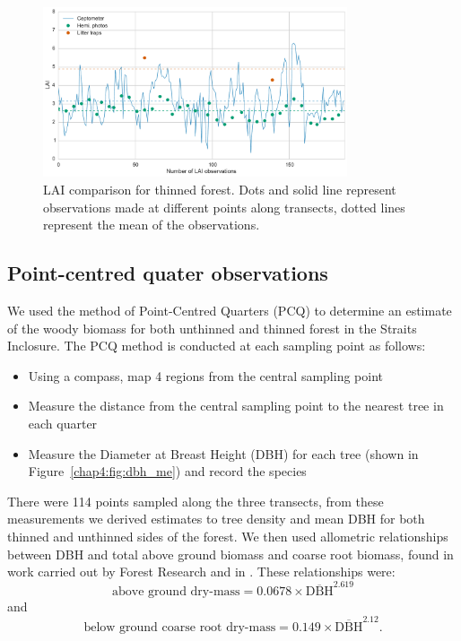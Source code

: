 \begin{figure}[ht]
    \centering
    \includegraphics[width=0.8\textwidth]{chapter/chapter4/thinned14.pdf}
    \caption{LAI comparison for thinned forest. Dots and solid line represent observations made at different points along transects, dotted lines represent the mean of the observations.} \label{chap4:fig:lai_comp14}
\end{figure}

\subsection{Point-centred quater observations} \label{chap4:sec:pcq}

We used the method of Point-Centred Quarters (PCQ) \citep{dahdouh2006empirical} to determine an estimate of the woody biomass for both unthinned and thinned forest in the Straits Inclosure. The PCQ method is conducted at each sampling point as follows:
\begin{itemize}
\item Using a compass, map 4 regions from the central sampling point
\item Measure the distance from the central sampling point to the nearest tree in each quarter
\item Measure the Diameter at Breast Height (DBH) for each tree (shown in Figure~\ref{chap4:fig:dbh_me}) and record the species 
\end{itemize}
There were 114 points sampled along the three transects, from these measurements we derived estimates to tree density and mean DBH for both thinned and unthinned sides of the forest. We then used allometric relationships between DBH and total above ground biomass and coarse root biomass, found in work carried out by Forest Research and in \citet{mckay2003woodfuel}. These relationships were:
\begin{equation}
\text{above ground dry-mass} = 0.0678\times \overline{\text{DBH}}^{2.619}
\end{equation}
and
\begin{equation}
\text{below ground coarse root dry-mass} = 0.149\times \overline{\text{DBH}}^{2.12}.
\end{equation}

